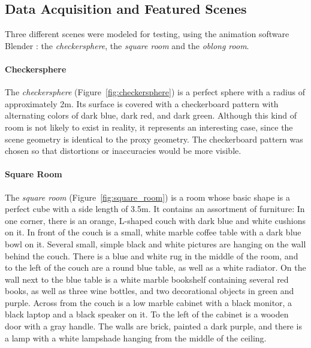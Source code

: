\subsection{Data Acquisition and Featured Scenes} \label{subsec:data_acquisition}


Three different scenes were modeled for testing, using the animation software Blender \cite{blender}: the \emph{checkersphere}, the \emph{square room} and the \emph{oblong room}.%

\paragraph{Checkersphere}
The \emph{checkersphere} (Figure~\ref{fig:checkersphere}) is a perfect sphere with a radius of approximately 2m. Its surface is covered with a checkerboard pattern with alternating colors of dark blue, dark red, and dark green.
Although this kind of room is not likely to exist in reality, it represents an interesting case, since the scene geometry is identical to the proxy geometry. The checkerboard pattern was chosen so that distortions or inaccuracies would be more visible.

\paragraph{Square Room}
The \emph{square room} (Figure~\ref{fig:square_room}) is a room whose basic shape is a perfect cube with a side length of 3.5m. It contains an assortment of furniture\footnotemark: In one corner, there is an orange, L-shaped couch with dark blue and white cushions on it. In front of the couch is a small, white marble coffee table with a dark blue bowl on it. Several small, simple black and white pictures are hanging on the wall behind the couch. There is a blue and white rug in the middle of the room, and to the left of the couch are a round blue table, as well as a white radiator. On the wall next to the blue table is a white marble bookshelf containing several red books, as well as three wine bottles, and two decorational objects in green and purple. Across from the couch is a low marble cabinet with a black monitor, a black laptop and a black speaker on it. To the left of the cabinet is a wooden door with a gray handle. The walls are brick, painted a dark purple, and there is a lamp with a white lampshade hanging from the middle of the ceiling.

